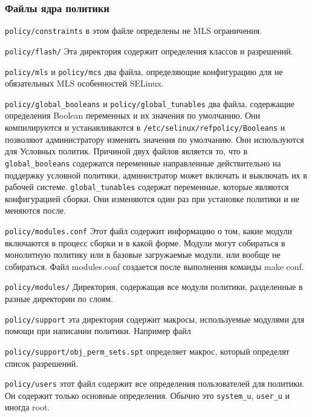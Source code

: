 \documentclass{./../class/UIR}
\begin{document}
	\subsubsection{Файлы ядра политики}
	
	\begin{description}
	  \item \verb"policy/constraints"  в этом файле определены не MLS ограничения.
	  \item \verb"policy/flash/"  Эта директория содержит определения классов и
	  разрешений.
	  \item \verb"policy/mls"  и \verb"policy/mcs" два файла, определяющие
	  конфигурацию для не обязательных MLS особенностей  SELinux.
	  \item \verb"policy/global_booleans" и \verb"policy/global_tunables" два
	  файла, содержащие определения Boolean переменных и их значения по умолчанию.
	  Они компилируются и устанавливаются в \verb"/etc/selinux/refpolicy/Booleans"
	  и позволяют администратору изменять значения по умолчанию. Они используются
	  для Условных политик. Причиной двух файлов является то, что в
	  \verb"global_booleans" содержатся переменные направленные действительно на
	  поддержку условной политики, администратор может включать и выключать их в рабочей системе.
	  \verb"global_tunables"  содержат переменные, которые являются конфигурацией
	  сборки.
	  Они изменяются один раз при установке политики и не меняются после.
	  \item  \verb"policy/modules.conf" Этот файл содержит
	  информацию о том, какие модули включаются в процесс сборки и в какой форме.
      Модули могут собираться в монолитную политику или в базовые загружаемые модули,
      или вообще не собираться. Файл modules.conf
	  создается после выполнения команды make conf.
	  \item \verb"policy/modules/" Директория, содержащая
	  все модули политики, разделенные в разные директории по слоям.
	  \item \verb"policy/support" эта директория содержит макросы, используемые
	  модулями для помощи при написании политики. Например
	  файл 
	  
	  \verb"policy/support/obj_perm_sets.spt"  определяет макрос, который
	  определят список разрешений.
	  \item \verb"policy/users"  этот файл содержит все определения пользователей
	  для политики. Он содержит только основные определения.
	  Обычно это \verb"system_u", \verb"user_u" и иногда root.
	\end{description}
	
\end{document}
